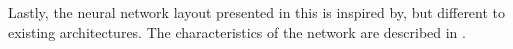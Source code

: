 

Lastly, the neural network layout presented in this \thesisdiss{} is inspired by, but different to existing architectures. The characteristics of the network are described in .
